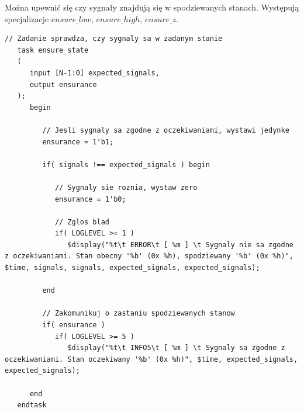 \documentclass[a4paper,12pt]{article}
\begin{document}
Można upewnić się czy sygnały znajdują się w spodziewanych stanach. Występują specjalizacje $ensure\_low$, $ensure\_high$, $ensure\_z$.
\begin{lstlisting}[label=Monitor,caption=Monitor.v,firstnumber=27]
   // Zadanie sprawdza, czy sygnaly sa w zadanym stanie
   task ensure_state
   (
      input [N-1:0] expected_signals,
      output ensurance
   );
      begin

         // Jesli sygnaly sa zgodne z oczekiwaniami, wystawi jedynke
         ensurance = 1'b1;

         if( signals !== expected_signals ) begin

            // Sygnaly sie roznia, wystaw zero
            ensurance = 1'b0;

            // Zglos blad
            if( LOGLEVEL >= 1 )
               $display("%t\t ERROR\t [ %m ] \t Sygnaly nie sa zgodne z oczekiwaniami. Stan obecny '%b' (0x %h), spodziewany '%b' (0x %h)", $time, signals, signals, expected_signals, expected_signals);

         end

         // Zakomunikuj o zastaniu spodziewanych stanow
         if( ensurance )
            if( LOGLEVEL >= 5 )
               $display("%t\t INFO5\t [ %m ] \t Sygnaly sa zgodne z oczekiwaniami. Stan oczekiwany '%b' (0x %h)", $time, expected_signals, expected_signals);

      end
   endtask
\end{lstlisting}
\end{document}
